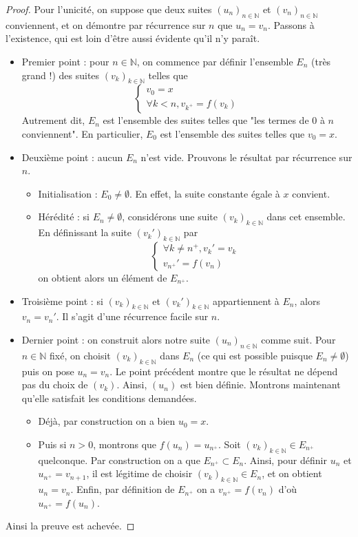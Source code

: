 \documentclass[french]{book}
\theoremstyle{plain}
\theoremstyle{definition}
\theoremstyle{remark}
\begin{document}
\begin{proof}
	Pour l'unicité, on suppose que deux suites $(u_n)_{n \in \mathbb{N}}$ et $(v_n)_{n \in \mathbb{N}}$ conviennent, et on démontre par récurrence sur $n$ que $u_n = v_n$. Passons à l'existence, qui est loin d'être aussi évidente qu'il n'y paraît.
	\begin{itemize}
		\item Premier point : pour $n \in \mathbb{N}$, on commence par définir l'ensemble $E_n$ (très grand !) des suites $(v_k)_{k \in \mathbb{N}}$ telles que $$\begin{cases}
			v_0 = x \\
			\forall k < n, v_{k^+} = f(v_k)
		\end{cases}$$
		Autrement dit, $E_n$ est l'ensemble des suites telles que "les termes de 0 à $n$ conviennent". En particulier, $E_0$ est l'ensemble des suites telles que $v_0 = x$.
		\item Deuxième point : aucun $E_n$ n'est vide. Prouvons le résultat par récurrence sur $n$.
		\begin{itemize}
			\item Initialisation : $E_0 \neq \emptyset$. En effet, la suite constante égale à $x$ convient.
			\item Hérédité : si $E_n \neq \emptyset$, considérons une suite $(v_k)_{k \in \mathbb{N}}$ dans cet ensemble. En définissant la suite $(v_k')_{k \in \mathbb{N}}$ par $$\begin{cases}
				\forall k \neq n^+, v_k' = v_k \\
				v_{n^+}' = f(v_n)
			\end{cases}$$
			on obtient alors un élément de $E_{n^+}$.
		\end{itemize}
		\item Troisième point : si $(v_k)_{k \in \mathbb{N}}$ et $(v_k')_{k \in \mathbb{N}}$ appartiennent à $E_n$, alors $v_n = v_n'$. Il s'agit d'une récurrence facile sur $n$.
		\item Dernier point : on construit alors notre suite $(u_n)_{n \in \mathbb{N}}$ comme suit. Pour $n \in \mathbb{N}$ fixé, on choisit $(v_k)_{k \in \mathbb{N}}$ dans $E_n$ (ce qui est possible puisque $E_n \neq \emptyset$) puis on pose $u_n = v_n$. Le point précédent montre que le résultat ne dépend pas du choix de $(v_k)$. Ainsi, $(u_n)$ est bien définie. Montrons maintenant qu'elle satisfait les conditions demandées.
		\begin{itemize}
			\item[--] Déjà, par construction on a bien $u_0 = x$.
			\item[--] Puis si $n > 0$, montrons que $f(u_n) = u_{n^+}$. Soit $(v_k)_{k \in \mathbb{N}} \in E_{n^+}$ quelconque. Par construction on a que $E_{n^+} \subset E_n$. Ainsi, pour définir $u_n$ et $u_{n^+} = v_{n+1}$, il est légitime de choisir $(v_k)_{k \in \mathbb{N}} \in E_n$, et on obtient $u_n = v_n$. Enfin, par définition de $E_{n^+}$ on a $v_{n^+} = f(v_n)$ d'où $u_{n^+} = f(u_n)$.
		\end{itemize}
	\end{itemize}
	Ainsi la preuve est achevée.
\end{proof}
\end{document}
